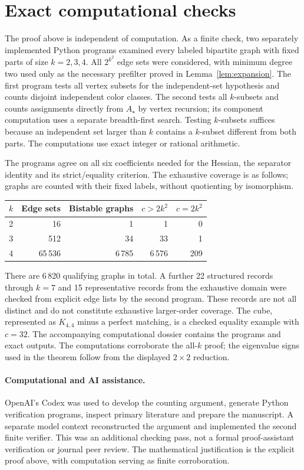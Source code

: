 \documentclass[11pt]{article}
\begin{document}
\section{Exact computational checks}

The proof above is independent of computation. As a finite check, two
separately implemented Python programs examined every labeled bipartite
graph with fixed parts of size $k=2,3,4$. All $2^{k^2}$ edge sets were
considered, with minimum degree two used only as the necessary prefilter
proved in Lemma~\ref{lem:expansion}. The first program tests all vertex
subsets for the independent-set hypothesis and counts disjoint independent
color classes. The second tests all $k$-subsets and counts assignments
directly from $A_\star$ by vertex recursion; its component computation
uses a separate breadth-first search. Testing $k$-subsets suffices because
an independent set larger than $k$ contains a $k$-subset different from
both parts. The computations use exact integer or rational arithmetic.

The programs agree on all six coefficients needed for the Hessian,
the separator identity and its strict/equality criterion. The exhaustive
coverage is as follows; graphs are counted with their fixed labels, without
quotienting by isomorphism.
\begin{center}
\begin{tabular}{rrrrr}
\toprule
$k$ & Edge sets & Bistable graphs & $c>2k^2$ & $c=2k^2$\\
\midrule
2 & 16 & 1 & 1 & 0\\
3 & 512 & 34 & 33 & 1\\
4 & 65\,536 & 6\,785 & 6\,576 & 209\\
\bottomrule
\end{tabular}
\end{center}
There are 6\,820 qualifying graphs in total. A further 22 structured
records through $k=7$ and 15 representative records from the exhaustive
domain were checked from explicit edge lists by the second program.
These records are not all distinct and do not constitute exhaustive
larger-order coverage. The cube, represented as $K_{4,4}$ minus a perfect
matching, is a checked equality example with $c=32$.
The accompanying computational dossier contains the programs and exact
outputs. The computations corroborate the all-$k$ proof; the eigenvalue
signs used in the theorem follow from the displayed $2\times2$ reduction.

\paragraph{Computational and AI assistance.}
OpenAI's Codex was used to develop the counting argument, generate Python
verification programs, inspect primary literature and prepare the manuscript.
A separate model context reconstructed the argument and implemented the
second finite verifier. This was an additional checking pass, not a
formal proof-assistant verification or journal peer review. The mathematical
justification is the explicit proof above, with computation serving as
finite corroboration.



\end{document}
